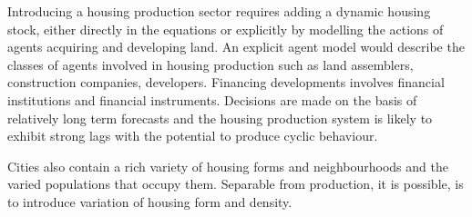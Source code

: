 Introducing a housing production sector requires adding a dynamic housing stock, either directly in the equations or explicitly by modelling the actions of agents acquiring and developing land. %
 An explicit agent model would describe the classes of agents involved in housing production such as land assemblers, construction companies, developers. 
Financing developments involves financial institutions and financial instruments. Decisions are made on the basis of relatively long term forecasts and the housing production system is likely to exhibit strong lags with the potential to produce cyclic behaviour.




Cities also contain a rich variety of housing forms and neighbourhoods and the varied populations that occupy them. Separable from production, it is possible, is to introduce variation of housing form and density.  %

